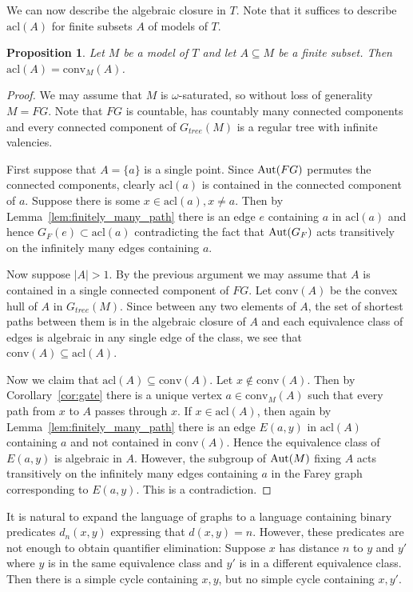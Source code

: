 \documentclass{amsart}
\newcommand{\conv}{\mathrm{conv}}
\newcommand{\acl}{\mathrm{acl}}
\newtheorem{proposition}[defi]{Proposition}
\def\Aut{\mathop{\rm Aut}\nolimits}
\begin{document}
We can now describe the algebraic closure in $T$. Note that it suffices to describe $\acl(A)$ for finite subsets $A$ of models of $T$. 
\begin{proposition}\label{prop:acl}
Let $M$ be a model of $T$ and let $A\subseteq M$ be a finite subset. Then $\acl(A)=\conv_M(A)$.
\end{proposition}
\begin{proof}
We may assume that $M$ is $\omega$-saturated, so without loss of generality $M=FG$. Note that $FG$ is countable, has countably many connected components and every connected component of $G_{tree}(M)$ is a regular tree with infinite valencies.

First suppose that $A=\{a\}$ is a single point. Since $\Aut(FG)$ permutes the connected components, clearly $\acl(a)$ is contained in the connected component of $a$.
Suppose there is some $x\in\acl(a), x\neq a$. Then by Lemma~\ref{lem:finitely_many_path}  there is an edge $e$ containing $a$ in $\acl(a)$ and hence $G_F(e)\subset \acl(a)$ contradicting the fact that  $\Aut(G_F)$ acts transitively on the infinitely many edges containing $a$.

Now suppose $|A|>1$. By the previous argument we may assume that $A$ is contained in a single connected component of $FG$.  Let $\conv(A)$ be the convex hull of $A$ in $G_{tree}(M)$. Since between any two elements of $A$, the set of shortest paths between them is in the algebraic closure of $A$ and each equivalence class of edges is algebraic in any single edge of the class, we see that $\conv(A)\subseteq\acl(A)$.

Now we claim that $\acl(A)\subseteq\conv(A)$. Let $x\notin\conv(A)$. Then by Corollary~\ref{cor:gate} there is a unique vertex $a\in\conv_M(A)$ such that every path from $x$ to $A$ passes through $x$. If $x\in\acl(A)$, then again by Lemma~\ref{lem:finitely_many_path} there is an edge $E(a,y)$ in $\acl(A)$ containing $a$ and not contained in $\conv(A)$. Hence the equivalence class of $E(a,y)$ is algebraic in $A$. However,  the subgroup of $\Aut(M)$ fixing $A$ acts transitively on the infinitely many edges containing $a$ in the Farey graph corresponding to $E(a,y)$. This is a contradiction.
\end{proof}



It is natural to expand the language of graphs to a language containing
binary predicates $d_n(x,y)$ expressing that $d(x,y)=n$. However, these
predicates are not enough to obtain quantifier elimination: Suppose $x$
has distance $n$ to $y$ and $y'$ where $y$ is in the same equivalence
class and $y'$ is in a different equivalence class. Then there is a
simple cycle containing $x,y$, but no simple cycle containing $x,y'$.
\end{document}
